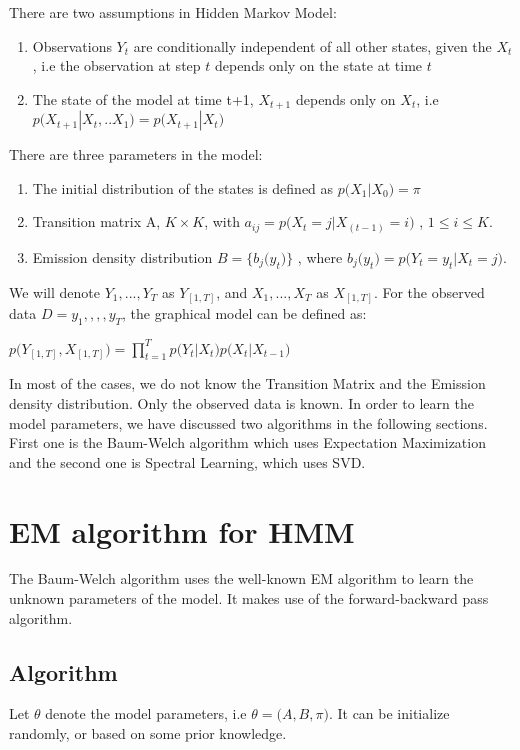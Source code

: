 \documentclass{article} %
\begin{document}
There are two assumptions in Hidden Markov Model:
\begin{enumerate}
\item Observations $Y_t$ are conditionally independent of all other states, given the \(X_t\), i.e the observation at step \(t\) depends only on the state at time \(t\)
\item The state of the model at time t+1, \(X_{t+1}\) depends only on \(X_t\), i.e 
\( p\big(X_{t+1}|X_t,..X_1\big) = p\big(X_{t+1}|X_t\big) \)
\end{enumerate}

There are three parameters in the model:
\begin{enumerate}
\item The initial distribution of the states is defined as \(p\big(X_1|X_0 \big) = \pi\)
\item Transition matrix A, \(K \times K \), with \(a_{ij} = p\big(X_t=j|X_(t-1)=i\big)\) , \(1\leq i \leq K \).
\item Emission density distribution \(B = \{b_{j}\big(y_t\big)\}\) , where \(b_{j}\big(y_t\big) = p\big(Y_t=y_t|X_t=j\big)\).
\end{enumerate}

We will denote \(Y_1,...,Y_T\) as \(Y_{[1,T]}\), and \(X_1,...,X_T\) as \(X_{[1,T]}\). For the observed data \(D ={y_1,,,,y_T}\), the graphical model can be defined as:

\begin{center} \(  p\big( Y_{[1,T]}, X_{[1,T]} \big) = \prod_{t=1}^{T}p\big(Y_t|X_t\big)p\big(X_t|X_{t-1}\big)  \)
\end{center}

In most of the cases, we do not know the Transition Matrix and the Emission density distribution. Only
the observed data is known. In order to learn the model parameters, we have discussed two algorithms in the following sections. First one is the Baum-Welch algorithm which uses Expectation Maximization and the second one is Spectral Learning, which uses SVD.

\section{EM algorithm for HMM}
\label{EM algorithm}
The Baum-Welch algorithm uses the well-known EM algorithm to learn the unknown parameters of the model. It makes use of the forward-backward pass algorithm. 

\subsection*{Algorithm}
Let $\theta$ denote the model parameters, i.e \( \theta = \big(A,B,\pi\big) \). It can be initialize randomly, or based on some prior knowledge.
\end{document}

